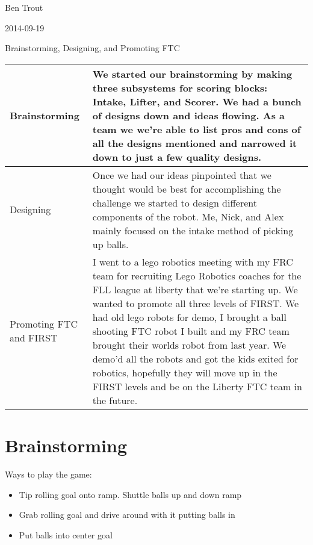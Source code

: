 Ben Trout

2014-09-19

Brainstorming, Designing, and Promoting FTC

\begin{tabular}{|p{5cm}|p{5cm}|}
 \hline
 Brainstorming&
 We started our brainstorming by making three subsystems for scoring blocks:
 Intake, Lifter, and Scorer. We had a bunch of designs down and ideas flowing.
 As a team we we’re able to list pros and cons of all the designs mentioned and narrowed
 it down to just a few quality designs.
 \\
 \hline
 Designing&
 Once we had our ideas pinpointed that we thought would be best for accomplishing
 the challenge we started to design different components of the robot.
 Me, Nick, and Alex mainly focused on the intake method of picking up balls.
 \\
 \hline
 Promoting FTC and FIRST&
 I went to a lego robotics meeting with my FRC team for recruiting Lego Robotics coaches
 for the FLL league at liberty that we’re starting up. We wanted to promote all three
 levels of FIRST. We had old lego robots for demo, I brought a ball shooting FTC robot
 I built and my FRC team brought their worlds robot from last year.
 We demo’d all the robots and got the kids exited for robotics, hopefully they will
 move up in the FIRST levels and be on the Liberty FTC team in the future.
 \\
 \hline
\end{tabular}

\section*{Brainstorming}
Ways to play the game:
\begin{itemize}
 \item Tip rolling goal onto ramp. Shuttle balls up and down ramp
 \item Grab rolling goal and drive around with it putting balls in
 \item Put balls into center goal %
\end{itemize}

